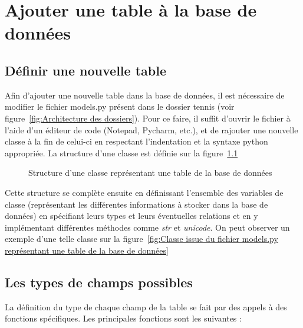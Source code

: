 \chapter{Ajouter une table à la base de données}
\label{ajouter une table}

\section{Définir une nouvelle table}

Afin d'ajouter une nouvelle table dans la base de données, il est nécessaire de modifier le fichier models.py présent dans le dossier tennis (voir figure~\ref{fig:Architecture des dossiers}). Pour ce faire, il suffit d'ouvrir le fichier à l'aide d'un éditeur de code (Notepad, Pycharm, etc.), et de rajouter une nouvelle classe à la fin de celui-ci en respectant l'indentation et la syntaxe python appropriée. La structure d'une classe est définie sur la figure~\ref{fig:Structure d'une classe représentant une table de la base de données}

\begin{figure}[!ht]
\centering
\begin{framed}

\end{framed}
\caption{Structure d'une classe représentant une table de la base de données}
\label{fig:Structure d'une classe représentant une table de la base de données}
\end{figure}
\FloatBarrier

Cette structure se complète ensuite en définissant l'ensemble des variables de classe (représentant les différentes informations à stocker dans la base de données) en spécifiant leurs types et leurs éventuelles relations et en y implémentant différentes méthodes comme \textit{str} et \textit{unicode}. On peut observer un exemple d'une telle classe sur la figure~\ref{fig:Classe issue du fichier models.py représentant une table de la base de données}

\section{Les types de champs possibles}

La définition du type de chaque champ de la table se fait par des appels à des fonctions spécifiques. Les principales fonctions sont les suivantes :\\

